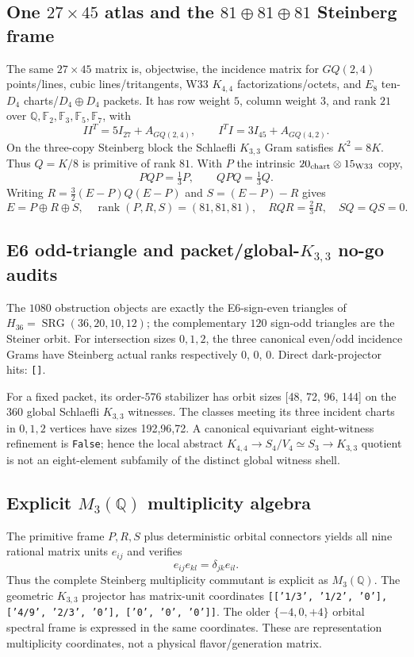 \subsection{One $27\times45$ atlas and the $81\oplus81\oplus81$ Steinberg frame}
The same $27\times45$ matrix is, objectwise, the incidence matrix for
$GQ(2,4)$ points/lines, cubic lines/tritangents, W33 $K_{4,4}$
factorizations/octets, and $E_8$ ten-$D_4$ charts/$D_4\oplus D_4$ packets.
It has row weight $5$, column weight $3$, and rank $21$ over
$\mathbb Q,\mathbb F_2,\mathbb F_3,\mathbb F_5,\mathbb F_7$, with
\[
 II^T=5I_{27}+A_{GQ(2,4)},\qquad I^TI=3I_{45}+A_{GQ(4,2)}.
\]
On the three-copy Steinberg block the Schlaefli $K_{3,3}$ Gram satisfies
$K^2=8K$.  Thus $Q=K/8$ is primitive of rank $81$.  With $P$ the intrinsic
$20_{\rm chart}\otimes15_{\rm W33}$ copy,
\[
 PQP=\tfrac13P,\qquad QPQ=\tfrac13Q.
\]
Writing $R=\tfrac32(E-P)Q(E-P)$ and $S=(E-P)-R$ gives
\[
 E=P\oplus R\oplus S,\quad \operatorname{rank}(P,R,S)=(81,81,81),
 \quad RQR=\tfrac23R,\quad SQ=QS=0.
\]

\subsection{E6 odd-triangle and packet/global-$K_{3,3}$ no-go audits}
The $1080$ obstruction objects are exactly the E6-sign-even triangles of
$H_{36}=\operatorname{SRG}(36,20,10,12)$; the complementary $120$ sign-odd
triangles are the Steiner orbit.  For intersection sizes $0,1,2$, the three
canonical even/odd incidence Grams have Steinberg actual ranks respectively
0, 0, 0.  Direct dark-projector hits: \texttt{[]}.

For a fixed packet, its order-$576$ stabilizer has orbit sizes [48, 72, 96, 144] on the
$360$ global Schlaefli $K_{3,3}$ witnesses.  The classes meeting its three
incident charts in $0,1,2$ vertices have sizes 192,96,72.  A canonical
equivariant eight-witness refinement is \texttt{False}; hence the local abstract
$K_{4,4}\to S_4/V_4\simeq S_3\to K_{3,3}$ quotient is not an eight-element
subfamily of the distinct global witness shell.

\subsection{Explicit $M_3(\mathbb Q)$ multiplicity algebra}
The primitive frame $P,R,S$ plus deterministic orbital connectors yields all
nine rational matrix units $e_{ij}$ and verifies
\[
 e_{ij}e_{kl}=\delta_{jk}e_{il}.
\]
Thus the complete Steinberg multiplicity commutant is explicit as
$M_3(\mathbb Q)$.  The geometric $K_{3,3}$ projector has matrix-unit
coordinates \texttt{[['1/3', '1/2', '0'], ['4/9', '2/3', '0'], ['0', '0', '0']]}.  The older $\{-4,0,+4\}$ orbital spectral frame is
expressed in the same coordinates.  These are representation multiplicity
coordinates, not a physical flavor/generation matrix.

